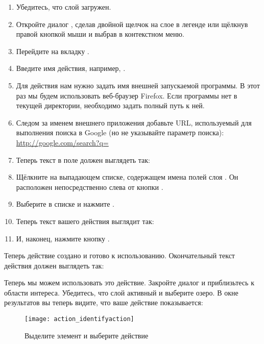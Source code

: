 \begin{enumerate}
\item Убедитесь, что слой  загружен.
\item Откройте диалог , сделав двойной щелчок на слое в
легенде или щёлкнув правой кнопкой мыши и выбрав  в
контекстном меню.
\item Перейдите на вкладку .
\item Введите имя действия, например, .
\item Для действия нам нужно задать имя внешней запускаемой программы.
В этот раз мы будем использовать веб-браузер Firefox. Если программы нет в текущей
директории, необходимо задать полный путь к ней.
\item Следом за именем внешнего приложения добавьте URL, используемый для
выполнения поиска в Google (но не указывайте параметр поиска):
\url{http://google.com/search?q=}
\item Теперь текст в поле  должен выглядеть так:\\
\item Щёлкните на выпадающем списке, содержащем имена полей
слоя . Он расположен непосредственно слева от кнопки
.
\item Выберите в списке  и
нажмите .
\item Теперь текст вашего действия выглядит так:\\
\item И, наконец, нажмите кнопку .
\end{enumerate}

Теперь действие создано и готово к использованию. Окончательный текст
действия должен выглядеть так:


Теперь мы можем использовать это действие. Закройте диалог 
и приблизьтесь к области интереса. Убедитесь, что слой 
активный и выберите озеро. В окне результатов вы теперь видите, что ваше
действие показывается:

\begin{figure}[ht]
   \centering
   \texttt{[image: action\_identifyaction]}
   \caption{Выделите элемент и выберите действие \wincaption}\label{fig:identify_action}
\end{figure}

